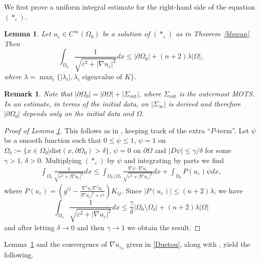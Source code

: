 \documentclass[11pt]{amsart}
\newtheorem{Lemma}[Theorem]{Lemma}
\newtheorem{Remark}[Theorem]{Remark}
\renewcommand{\epsilon}{\varepsilon}
\def\d{\delta}
\def\e{\epsilon}
\def\l{\lambda}
\def\out{\text{out}}
\begin{document}
We first prove a uniform integral estimate for the right-hand side of  the equation $(*_{{\varepsilon}})$.
\begin{Lemma}\label{normalintest}
Let $u_{{\varepsilon}}\in C^\infty(\Omega_0)$ be a solution of $(*_{{\varepsilon}})$ as  in  Theorem~\ref{blowup}. Then
\begin{equation}\label{intest}
\int_{\Omega_0}\frac{1}{\sqrt{\e^2+|\nabla{u}_{\varepsilon}|^2}}dx\leq|\partial\Omega_0|+(n+2)\lambda|\Omega|,
\end{equation}
where $\lambda=\max_i\{|\l_i|, \l_i\text{  eigenvalue of  } K\}$.
\end{Lemma}
\begin{Remark}\label{rmk on normalintest}
Note that $|\partial\Omega_0|=|\partial\Omega|+|\Sigma_\out|$, where $\Sigma_\out$ is the outermost MOTS. In \cite{AM09} an estimate, in terms of the initial data, on $|\Sigma_\infty|$ is derived and therefore $|\partial\Omega_0|$ depends only on the initial data and $\Omega$.
\end{Remark}
\begin{proof}[Proof of Lemma \ref{normalintest}]
This follows as in \cite[Lemma 2.1]{MS}, keeping track of the extra ``$P$-term''. 
Let $\psi$ be a smooth function such that $0\leq\psi\leq1$, $\psi=1$ on $\Omega_{\delta}:=\{x\in\Omega_0|\text{dist}(x,\partial\Omega_0)>\delta\}$, $\psi=0$ on $\partial\Omega$ and $|D\psi|\leq\gamma/\delta$ for some $\gamma>1,\,\delta>0$. Multiplying $(*_{\varepsilon})$ by $\psi$ and integrating by parts we find
\begin{equation*}\begin{split}
\int_{\Omega_\d}\frac{1 }{\sqrt{\varepsilon^2+|\nabla u_{\varepsilon}|^2}}dx\leq \int_{\Omega_0\setminus\Omega_{\delta}}\frac{\nabla \psi\cdot \nabla u_{\varepsilon}}{\sqrt{\varepsilon^2+|\nabla u_{\varepsilon}|^2}}dx+\int_{\Omega_0}P(u_\e)\psi dx,
\end{split}\end{equation*}
where $P(u_\e)=\left(g^{ij}-\frac{\nabla^i u_\e\nabla^j u_\e}{|\nabla u_\e|^2+\e^2}\right) K_{ij}$.
Since $|P(u_\e)|\le (n+2)\l$, we have
\[\int_{\Omega_\d}\frac{1 }{\sqrt{\varepsilon^2+|\nabla u_{\varepsilon}|^2}}dx\leq\frac{\gamma}{\delta}|\Omega_0\setminus\Omega_{\delta}|+(n+2)\lambda|\Omega|\]
and after letting $\d\to 0$ and then $\gamma\to 1$ we obtain the result.
\end{proof}


Lemma~\ref{normalintest} and  the convergence of $\nabla u_{\e_k}$ given in \eqref{Duetou}, along with \cite[Theorems 3.1, 3.2 and 3.3]{ES4}, yield the following.
\end{document}
